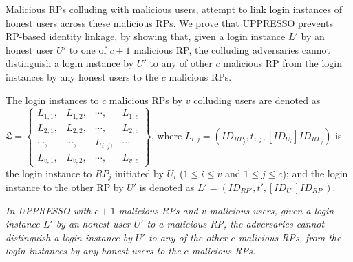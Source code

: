 {{%

Malicious RPs colluding with malicious users, attempt to link login instances
        of honest users across these malicious RPs.
We prove that UPPRESSO prevents RP-based identity linkage, by showing that,
    given a login instance $L'$ by an honest user $U'$ to one of $c+1$ malicious RP,
    the colluding adversaries cannot distinguish a login instance by $U'$ to any of other $c$ malicious RP
        from the login instances by any honest users to the $c$ malicious RPs.

The login instances to $c$ malicious RPs by $v$ colluding users
    are denoted as $\mathfrak{L}=\left \{ \begin{matrix}
L_{1,1},&L_{1,2},&\cdots,&L_{1,c}\\
L_{2,1},& L_{2,2},&\cdots,&L_{2,c}\\
\cdots,&\cdots,&L_{i,j},&\cdots\\
L_{v,1},&L_{v,2},&\cdots,&L_{v,c}
\end{matrix}\right\}$, where $L_{i,j} = (ID_{RP_j}, t_{i,j}, [ID_{U_i}]ID_{RP_j})$
    is the login instance to $RP_j$ initiated by $U_i$ ($1 \le i \le v$ and $1 \le j \le c$);
and the login instance to the other RP by $U'$ is denoted as $L' = (ID_{RP'}, t', [ID_{U'}]ID_{RP'})$.



\vspace{1mm}
 {\em
In UPPRESSO with $c+1$ malicious RPs and $v$ malicious users,
given a login instance $L'$ by an honest user $U'$ to a malicious RP,
    the adversaries cannot distinguish a login instance by $U'$ to any of the other $c$ malicious RPs,
        from the login instances by any honest users to the $c$ malicious RPs.}


}}
